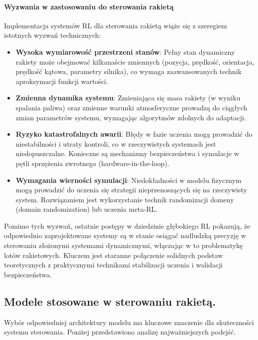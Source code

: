 \paragraph{Wyzwania w zastosowaniu do sterowania rakietą}
Implementacja systemów RL dla sterowania rakietą wiąże się z szeregiem istotnych wyzwań technicznych:

\begin{itemize}
    \item \textbf{Wysoka wymiarowość przestrzeni stanów}: Pełny stan dynamiczny rakiety może obejmować kilkanaście zmiennych (pozycja, prędkość, orientacja, prędkość kątowa, parametry silnika), co wymaga zaawansowanych technik aproksymacji funkcji wartości.

    \item \textbf{Zmienna dynamika systemu}: Zmieniająca się masa rakiety (w wyniku spalania paliwa) oraz zmienne warunki atmosferyczne prowadzą do ciągłych zmian parametrów systemu, wymagając algorytmów zdolnych do adaptacji.

    \item \textbf{Ryzyko katastrofalnych awarii}: Błędy w fazie uczenia mogą prowadzić do niestabilności i utraty kontroli, co w rzeczywistych systemach jest niedopuszczalne. Konieczne są mechanizmy bezpieczeństwa i symulacje w pętli sprzężenia zwrotnego (hardware-in-the-loop).

    \item \textbf{Wymagania wierności symulacji}: Niedokładności w modelu fizycznym mogą prowadzić do uczenia się strategii nieprzenoszących się na rzeczywisty system. Rozwiązaniem jest wykorzystanie technik randomizacji domeny (domain randomization) lub uczenia meta-RL.
\end{itemize}

Pomimo tych wyzwań, ostatnie postępy w dziedzinie głębokiego RL pokazują, że odpowiednio zaprojektowane systemy są w stanie osiągać nadludzką precyzję w sterowaniu złożonymi systemami dynamicznymi, włączając w to problematykę lotów rakietowych. Kluczem jest staranne połączenie solidnych podstaw teoretycznych z praktycznymi technikami stabilizacji uczenia i walidacji bezpieczeństwa.

\subsection{Modele stosowane w sterowaniu rakietą.}
\label{sec:modele-stosowane-w-sterowaniu-rakieta.}

Wybór odpowiedniej architektury modelu ma kluczowe znaczenie dla skuteczności systemu sterowania. Poniżej przedstawiono analizę najważniejszych podejść.

